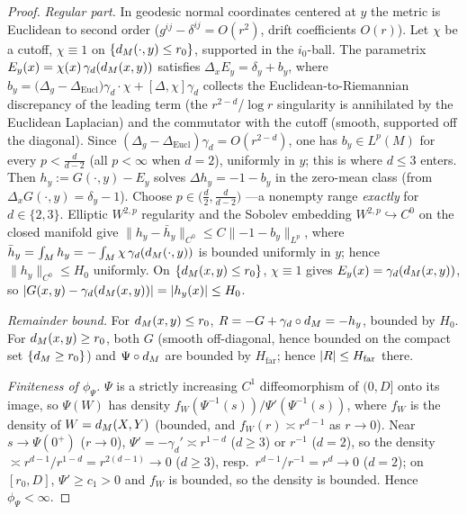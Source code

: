 \begin{proof}
\emph{Regular part.} In geodesic normal coordinates centered at $y$ the metric is
Euclidean to second order ($g^{ij}-\delta^{ij}=O(r^2)$, drift coefficients $O(r)$). Let
$\chi$ be a cutoff, $\chi\equiv1$ on $\{d_M(\cdot,y)\le r_0\}$, supported in the
$i_0$-ball. The parametrix $E_y(x)=\chi(x)\,\gamma_d(d_M(x,y))$ satisfies
$\Delta_x E_y=\delta_y+b_y$, where $b_y=\bigl(\Delta_g-\Delta_{\mathrm{Eucl}}\bigr)\gamma_d\cdot\chi
+[\Delta,\chi]\gamma_d$ collects the Euclidean-to-Riemannian discrepancy of the leading
term (the $r^{2-d}$/$\log r$ singularity is annihilated by the Euclidean Laplacian) and
the commutator with the cutoff (smooth, supported off the diagonal). Since
$(\Delta_g-\Delta_{\mathrm{Eucl}})\gamma_d=O(r^{2-d})$, one has $b_y\in L^p(M)$ for every
$p<\tfrac{d}{d-2}$ (all $p<\infty$ when $d=2$), uniformly in $y$; this is where $d\le3$
enters. Then $h_y:=G(\cdot,y)-E_y$ solves $\Delta h_y=-1-b_y$ in the zero-mean class
(from $\Delta_x G(\cdot,y)=\delta_y-1$). Choose $p\in\bigl(\tfrac d2,\tfrac{d}{d-2}\bigr)$
---a nonempty range \emph{exactly} for $d\in\{2,3\}$. Elliptic $W^{2,p}$ regularity and
the Sobolev embedding $W^{2,p}\hookrightarrow C^0$ on the closed manifold give
$\lVert h_y-\bar h_y\rVert_{C^0}\le C\lVert-1-b_y\rVert_{L^p}$, where
$\bar h_y=\int_M h_y=-\int_M\chi\,\gamma_d(d_M(\cdot,y))$ is bounded uniformly in $y$;
hence $\lVert h_y\rVert_{C^0}\le H_0$ uniformly. On $\{d_M(x,y)\le r_0\}$, $\chi\equiv1$
gives $E_y(x)=\gamma_d(d_M(x,y))$, so $\lvert G(x,y)-\gamma_d(d_M(x,y))\rvert
=\lvert h_y(x)\rvert\le H_0$.

\emph{Remainder bound.} For $d_M(x,y)\le r_0$, $R=-G+\gamma_d\circ d_M=-h_y$, bounded by
$H_0$. For $d_M(x,y)\ge r_0$, both $G$ (smooth off-diagonal, hence bounded on the compact
set $\{d_M\ge r_0\}$) and $\Psi\circ d_M$ are bounded by $H_{\mathrm{far}}$; hence
$\lvert R\rvert\le H_{\mathrm{far}}$ there.

\emph{Finiteness of $\phi_\Psi$.} $\Psi$ is a strictly increasing $C^1$ diffeomorphism of
$(0,D]$ onto its image, so $\Psi(W)$ has density $f_W(\Psi^{-1}(s))/\Psi'(\Psi^{-1}(s))$,
where $f_W$ is the density of $W=d_M(X,Y)$ (bounded, and $f_W(r)\asymp r^{d-1}$ as
$r\to0$). Near $s\to\Psi(0^+)$ ($r\to0$), $\Psi'=-\gamma_d'\asymp r^{1-d}$ ($d\ge3$) or
$r^{-1}$ ($d=2$), so the density $\asymp r^{d-1}/r^{1-d}=r^{2(d-1)}\to0$ ($d\ge3$), resp.\
$r^{d-1}/r^{-1}=r^{d}\to0$ ($d=2$); on $[r_0,D]$, $\Psi'\ge c_1>0$ and $f_W$ is bounded, so
the density is bounded. Hence $\phi_\Psi<\infty$.
\end{proof}

